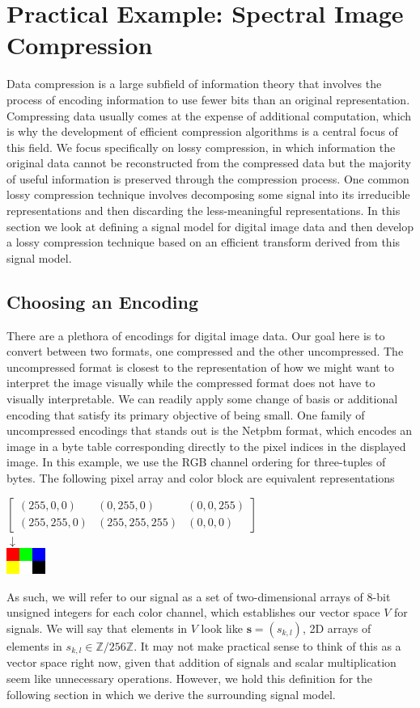 \documentclass[12pt,technote]{IEEEtran}
\begin{document}
\section{Practical Example: Spectral Image Compression}
Data compression is a large subfield of information theory that involves the process of encoding information to use fewer bits than an original representation. Compressing data usually comes at the expense of additional computation, which is why the development of efficient compression algorithms is a central focus of this field. We focus specifically on lossy compression, in which information the original data cannot be reconstructed from the compressed data but the majority of useful information is preserved through the compression process. One common lossy compression technique involves decomposing some signal into its irreducible representations and then discarding the less-meaningful representations. In this section we look at defining a signal model for digital image data and then develop a lossy compression technique based on an efficient transform derived from this signal model.
\subsection{Choosing an Encoding}
There are a plethora of encodings for digital image data. Our goal here is to convert between two formats, one compressed and the other uncompressed. The uncompressed format is closest to the representation of how we might want to interpret the image visually while the compressed format does not have to visually interpretable. We can readily apply some change of basis or additional encoding that satisfy its primary objective of being small. One family of uncompressed encodings that stands out is the Netpbm format, which encodes an image in a byte table corresponding directly to the pixel indices in the displayed image. In this example, we use the RGB channel ordering for three-tuples of bytes. The following pixel array and color block are equivalent representations

\begin{center}
    $\begin{bmatrix}
        (255, 0, 0) & (0, 255, 0) & (0, 0, 255)\\
        (255, 255, 0) & (255, 255, 255) & (0, 0, 0)
    \end{bmatrix}$\\
    $\downarrow$\\
    \includegraphics[width=0.5in]{figures/ppm_example.png}
\end{center}
As such, we will refer to our signal as a set of two-dimensional arrays of 8-bit unsigned integers for each color channel, which establishes our vector space $V$ for signals. We will say that elements in $V$ look like $\mathbf{s} = (s_{k,l})$, 2D arrays of elements in $s_{k,l}\in \mathbb{Z}/ 256\mathbb{Z}$. It may not make practical sense to think of this as a vector space right now, given that addition of signals and scalar multiplication seem like unnecessary operations. However, we hold this definition for the following section in which we derive the surrounding signal model.
\end{document}
